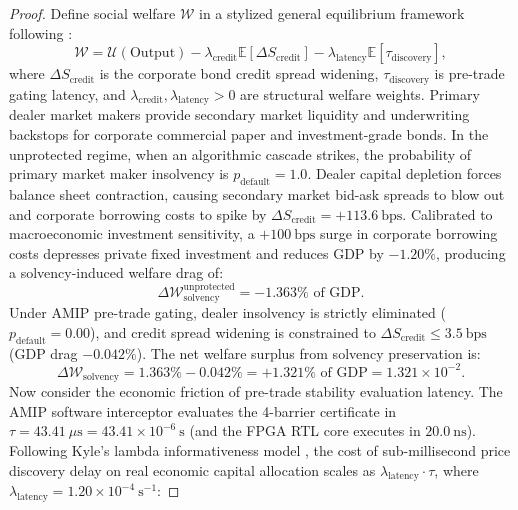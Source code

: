 \documentclass[11pt,a4paper]{article}
\theoremstyle{definition}\newtheorem{definition}[theorem]{Definition}
\theoremstyle{remark}\newtheorem{remark}[theorem]{Remark}
\begin{document}
\begin{proof}
Define social welfare $\mathcal{W}$ in a stylized general equilibrium framework following \cite{brunnermeier2009market,almgren2000optimal}:
\begin{equation}
\mathcal{W} = \mathcal{U}(\text{Output}) - \lambda_{\text{credit}} \mathbb{E}[\Delta S_{\text{credit}}] - \lambda_{\text{latency}} \mathbb{E}[\tau_{\text{discovery}}],
\end{equation}
where $\Delta S_{\text{credit}}$ is the corporate bond credit spread widening, $\tau_{\text{discovery}}$ is pre-trade gating latency, and $\lambda_{\text{credit}}, \lambda_{\text{latency}} > 0$ are structural welfare weights.
Primary dealer market makers provide secondary market liquidity and underwriting backstops for corporate commercial paper and investment-grade bonds.
In the unprotected regime, when an algorithmic cascade strikes, the probability of primary market maker insolvency is $p_{\text{default}} = 1.0$. Dealer capital depletion forces balance sheet contraction, causing secondary market bid-ask spreads to blow out and corporate borrowing costs to spike by $\Delta S_{\text{credit}} = +113.6~\text{bps}$.
Calibrated to macroeconomic investment sensitivity, a $+100~\text{bps}$ surge in corporate borrowing costs depresses private fixed investment and reduces GDP by $-1.20\%$, producing a solvency-induced welfare drag of:
\begin{equation}
\Delta \mathcal{W}_{\text{solvency}}^{\text{unprotected}} = -1.363\% \text{ of GDP}.
\end{equation}
Under AMIP pre-trade gating, dealer insolvency is strictly eliminated ($p_{\text{default}} = 0.00$), and credit spread widening is constrained to $\Delta S_{\text{credit}} \le 3.5~\text{bps}$ (GDP drag $-0.042\%$). The net welfare surplus from solvency preservation is:
\begin{equation}
\Delta \mathcal{W}_{\text{solvency}} = 1.363\% - 0.042\% = +1.321\% \text{ of GDP} = 1.321 \times 10^{-2}.
\end{equation}
Now consider the economic friction of pre-trade stability evaluation latency. The AMIP software interceptor evaluates the 4-barrier certificate in $\tau = 43.41~\mu\text{s} = 43.41 \times 10^{-6}~\text{s}$ (and the FPGA RTL core executes in $20.0~\text{ns}$).
Following Kyle's lambda informativeness model \cite{kyle1985continuous}, the cost of sub-millisecond price discovery delay on real economic capital allocation scales as $\lambda_{\text{latency}} \cdot \tau$, where $\lambda_{\text{latency}} = 1.20 \times 10^{-4}~\text{s}^{-1}$:

\end{proof}
\end{document}
